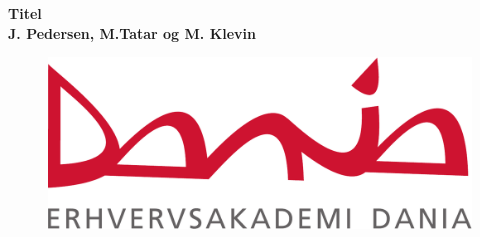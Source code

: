 \begin{titlepage}
   
   \begin{center}
   
      \Huge\textbf{Titel}
      \\
      \Large\textbf{J. Pedersen, M.Tatar og M. Klevin}
      	\begin{center}
		\begin{figure}
		\includegraphics[width=\linewidth]{Files/Front/dania.pdf}
		\end{figure}
       \end{center}   
   \end{center}
   \thispagestyle{empty}
\end{titlepage}